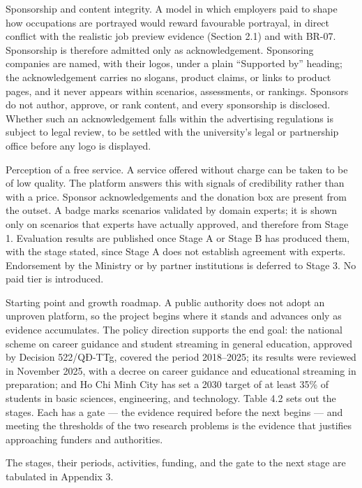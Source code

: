 Sponsorship and content integrity. A model in which employers paid to shape how occupations are portrayed would reward favourable portrayal, in direct conflict with the realistic job preview evidence (Section 2.1) and with BR-07. Sponsorship is therefore admitted only as acknowledgement. Sponsoring companies are named, with their logos, under a plain ``Supported by'' heading; the acknowledgement carries no slogans, product claims, or links to product pages, and it never appears within scenarios, assessments, or rankings. Sponsors do not author, approve, or rank content, and every sponsorship is disclosed. Whether such an acknowledgement falls within the advertising regulations is subject to legal review, to be settled with the university's legal or partnership office before any logo is displayed.

Perception of a free service. A service offered without charge can be taken to be of low quality. The platform answers this with signals of credibility rather than with a price. Sponsor acknowledgements and the donation box are present from the outset. A badge marks scenarios validated by domain experts; it is shown only on scenarios that experts have actually approved, and therefore from Stage 1. Evaluation results are published once Stage A or Stage B has produced them, with the stage stated, since Stage A does not establish agreement with experts. Endorsement by the Ministry or by partner institutions is deferred to Stage 3. No paid tier is introduced.

Starting point and growth roadmap. A public authority does not adopt an unproven platform, so the project begins where it stands and advances only as evidence accumulates. The policy direction supports the end goal: the national scheme on career guidance and student streaming in general education, approved by Decision 522/QĐ-TTg, covered the period 2018--2025\cite{r95}; its results were reviewed in November 2025, with a decree on career guidance and educational streaming in preparation\cite{r96}; and Ho Chi Minh City has set a 2030 target of at least 35\% of students in basic sciences, engineering, and technology\cite{r97}. Table 4.2 sets out the stages. Each has a gate --- the evidence required before the next begins --- and meeting the thresholds of the two research problems is the evidence that justifies approaching funders and authorities.

The stages, their periods, activities, funding, and the gate to the next stage are tabulated in Appendix 3.


